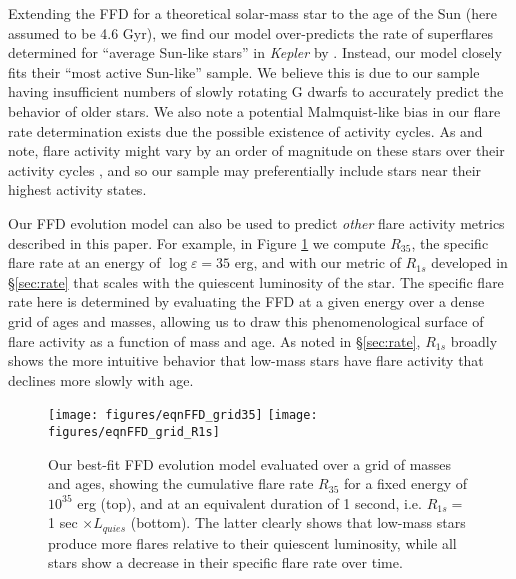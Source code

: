 \documentclass[preprint2]{aastex62}
\newcommand{\Kepler}{\textsl{Kepler}\xspace}
\begin{document}
Extending the FFD for a theoretical solar-mass star to the age of the Sun (here assumed to be 4.6 Gyr), we find our model over-predicts the rate of superflares determined for ``average Sun-like stars'' in \Kepler by \citet{shibayama2013}. Instead, our model closely fits their ``most active Sun-like'' sample. We believe this is due to our sample having insufficient numbers of slowly rotating G dwarfs to accurately predict the behavior of older stars. We also note a potential Malmquist-like bias in our flare rate determination exists due the possible existence of activity cycles. As \citet{shibayama2013} and \citet{clarke2018} note, flare activity might vary by an order of magnitude on these stars over their activity cycles \citep[see also][]{veronig2002}, and so our sample may preferentially include stars near their highest activity states.



Our FFD evolution model can also be used to predict {\it other} flare activity metrics described in this paper. For example, in Figure \ref{fig:grid} we compute $R_{35}$, the specific flare rate at an energy of $\log \varepsilon = 35$ erg, and with our metric of $R_{1s}$ developed in \S\ref{sec:rate} that scales with the quiescent luminosity of the star. The specific flare rate here is determined by evaluating the FFD at a given energy over a dense grid of ages and masses, allowing us to draw this phenomenological surface of flare activity as a function of mass and age. As noted in \S\ref{sec:rate}, $R_{1s}$ broadly shows the more intuitive behavior that low-mass stars have flare activity that declines more slowly with age. 


\begin{figure}[!t]
\centering
\texttt{[image: figures/eqnFFD\_grid35]}
\texttt{[image: figures/eqnFFD\_grid\_R1s]}
\caption{
Our best-fit FFD evolution model evaluated over a grid of masses and ages, showing the cumulative flare rate $R_{35}$ for a fixed energy of $10^35$ erg (top), and at an equivalent duration of 1 second, i.e. $R_{1s} = $ 1 sec $\times L_{quies}$ (bottom). The latter clearly shows that low-mass stars produce more flares relative to their quiescent luminosity, while all stars show a decrease in their specific flare rate over time.
}
\label{fig:grid}
\end{figure}
\end{document}
